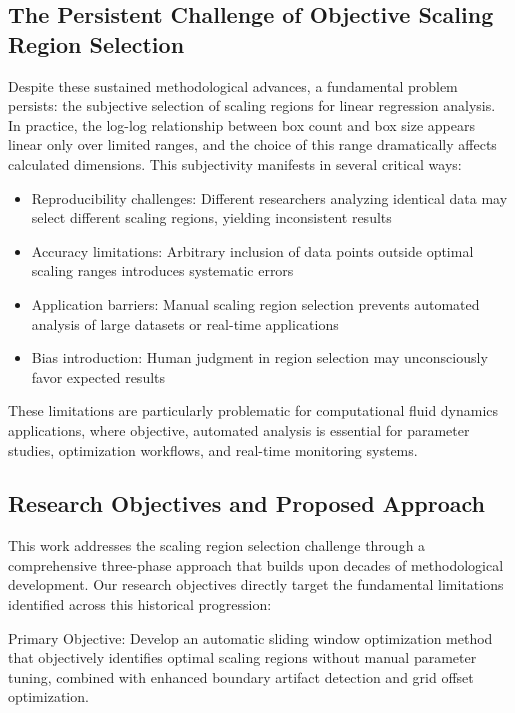 \documentclass[preprint,12pt]{elsarticle}
\def\textbf#1{#1}%
\begin{document}
\subsection{The Persistent Challenge of Objective Scaling Region Selection}

Despite these sustained methodological advances, a fundamental problem persists: the subjective selection of scaling regions for linear regression analysis. In practice, the log-log relationship between box count and box size appears linear only over limited ranges, and the choice of this range dramatically affects calculated dimensions. This subjectivity manifests in several critical ways:

\begin{itemize}
\item \textbf{Reproducibility challenges}: Different researchers analyzing identical data may select different scaling regions, yielding inconsistent results
\item \textbf{Accuracy limitations}: Arbitrary inclusion of data points outside optimal scaling ranges introduces systematic errors
\item \textbf{Application barriers}: Manual scaling region selection prevents automated analysis of large datasets or real-time applications
\item \textbf{Bias introduction}: Human judgment in region selection may unconsciously favor expected results
\end{itemize}

These limitations are particularly problematic for computational fluid dynamics applications, where objective, automated analysis is essential for parameter studies, optimization workflows, and real-time monitoring systems.

\subsection{Research Objectives and Proposed Approach}

This work addresses the scaling region selection challenge through a comprehensive three-phase approach that builds upon decades of methodological development. Our research objectives directly target the fundamental limitations identified across this historical progression:

\textbf{Primary Objective}: Develop an automatic sliding window optimization method that objectively identifies optimal scaling regions without manual parameter tuning, combined with enhanced boundary artifact detection and grid offset optimization.
\end{document}
